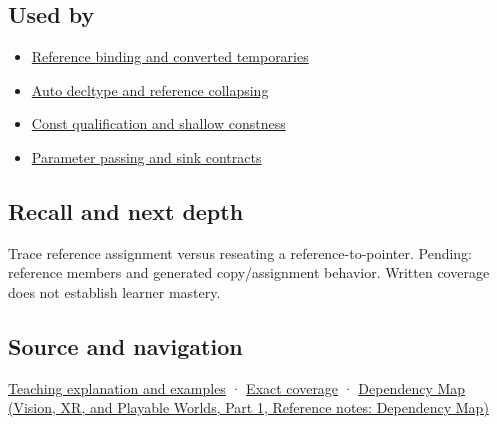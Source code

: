\subsection{Used by}\label{appendix-d6d562ca9fbb-used-by}

\hypertarget{appendix-d6d562ca9fbb-used-by}{}

\begin{itemize}
\tightlist
\item
  \hyperref[appendix-37856d997bb0]{Reference binding and converted temporaries}
\item
  \hyperref[appendix-5d4252a42886]{Auto decltype and reference collapsing}
\item
  \hyperref[appendix-c25d60fed375]{Const qualification and shallow constness}
\item
  \hyperref[appendix-d5908f75721f]{Parameter passing and sink contracts}
\end{itemize}

\subsection{Recall and next depth}\label{appendix-d6d562ca9fbb-recall-and-next-depth}

\hypertarget{appendix-d6d562ca9fbb-recall-and-next-depth}{}

Trace reference assignment versus reseating a reference-to-pointer. Pending: reference members and generated copy/assignment behavior. Written coverage does not establish learner mastery.

\subsection{Source and navigation}\label{appendix-d6d562ca9fbb-source-and-navigation}

\hypertarget{appendix-d6d562ca9fbb-source-and-navigation}{}

\hyperref[01-foundations-i-ch003-giving-another-name-to-a-live-object]{Teaching explanation and examples} · \hyperref[appendix-fd090d982a15-m008---parts-113-126]{Exact coverage} · \href{../07-Vision-XR-and-Playable-Worlds-P01/main.pdf\#appendix-4ad47bdd269a}{Dependency Map (Vision, XR, and Playable Worlds, Part 1, Reference notes: Dependency Map)}
